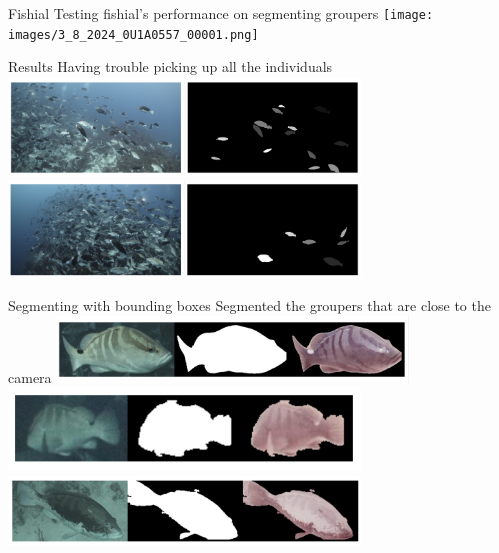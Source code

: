 \begin{frame}{Fishial}
   Testing fishial's performance on segmenting groupers 
   \centering
   \texttt{[image: images/3\_8\_2024\_0U1A0557\_00001.png]}

\end{frame}


\begin{frame}{Results}
    Having trouble picking up all the individuals
   \centering
   \includegraphics[height=0.7\textheight,width=0.7\textwidth,keepaspectratio]{images/gm3-1.png}
   \centering
   \includegraphics[height=0.7\textheight,width=0.7\textwidth,keepaspectratio]{images/gm3-2.png}

\end{frame}


\begin{frame}{Segmenting with bounding boxes}
    Segmented the groupers that are close to the camera
    \centering
   \includegraphics[height=0.7\textheight,width=0.7\textwidth,keepaspectratio]{images/gm3-3.png}
   \centering
   \includegraphics[height=0.7\textheight,width=0.7\textwidth,keepaspectratio]{images/gm3-4.png}
   \centering
   \includegraphics[height=0.7\textheight,width=0.7\textwidth,keepaspectratio]{images/gm3-5.png}
   

\end{frame}

